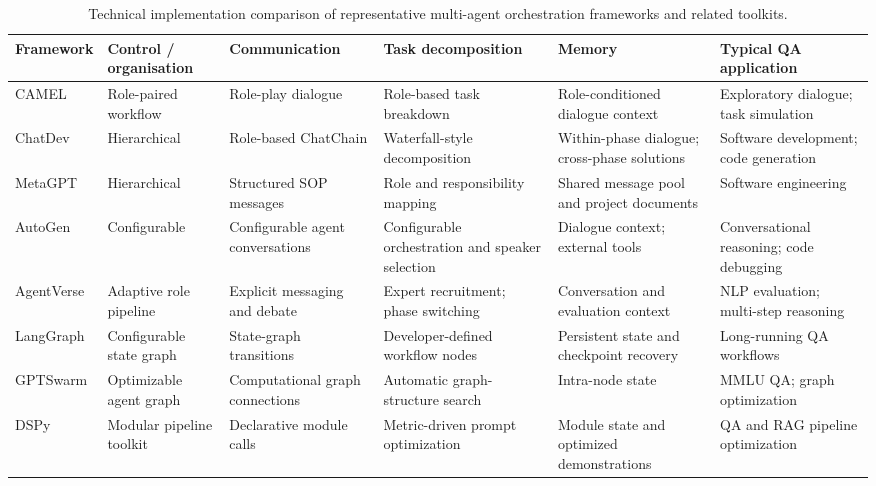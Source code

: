 \documentclass[a4paper,fleqn]{cas-dc}
\begin{document}
\begin{table}[pos=t,width=\textwidth]
  \centering
  \caption{Technical implementation comparison of representative multi-agent
           orchestration frameworks and related toolkits.}
  \label{tab:framework_compare}
  \small
  \setlength{\tabcolsep}{5pt}
  \renewcommand{\arraystretch}{1.0}
  \begin{tabularx}{\textwidth}{>{\raggedright\arraybackslash}p{2.6cm}
                  >{\raggedright\arraybackslash}p{2.0cm}
                  >{\raggedright\arraybackslash}X
                  >{\raggedright\arraybackslash}X
                  >{\raggedright\arraybackslash}X
                  >{\raggedright\arraybackslash}X}
    \toprule
    \textbf{Framework} & \textbf{Control / organisation} &
    \textbf{Communication} & \textbf{Task decomposition} &
    \textbf{Memory} & \textbf{Typical QA application} \\
    \midrule
    CAMEL \citep{li2023camel} & Role-paired workflow &
      Role-play dialogue &
      Role-based task breakdown &
      Role-conditioned dialogue context &
      Exploratory dialogue; task simulation \\
    ChatDev \citep{qian2023chatdev} & Hierarchical &
      Role-based ChatChain &
      Waterfall-style decomposition &
      Within-phase dialogue; cross-phase solutions &
      Software development; code generation \\
    MetaGPT \citep{hong2024metagpt} & Hierarchical &
      Structured SOP messages &
      Role and responsibility mapping &
      Shared message pool and project documents &
      Software engineering \\
    AutoGen \citep{wu2024autogen} & Configurable &
      Configurable agent conversations &
      Configurable orchestration and speaker selection &
      Dialogue context; external tools &
      Conversational reasoning; code debugging \\
    AgentVerse \citep{chen2024agentverse} & Adaptive role pipeline &
      Explicit messaging and debate &
      Expert recruitment; phase switching &
      Conversation and evaluation context &
      NLP evaluation; multi-step reasoning \\
    LangGraph \citep{langgraph2024,langgraph2024interrupt} & Configurable state graph &
      State-graph transitions &
      Developer-defined workflow nodes &
      Persistent state and checkpoint recovery &
      Long-running QA workflows \\
    GPTSwarm \citep{zhuge2024gptswarm} & Optimizable agent graph &
      Computational graph connections &
      Automatic graph-structure search &
      Intra-node state &
      MMLU QA; graph optimization \\
    DSPy \citep{khattab2024dspy} & Modular pipeline toolkit &
      Declarative module calls &
      Metric-driven prompt optimization &
      Module state and optimized demonstrations &
      QA and RAG pipeline optimization \\
    \bottomrule
  \end{tabularx}
\end{table}
\end{document}
